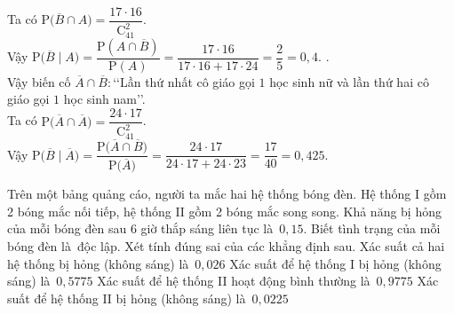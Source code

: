 \begin{ex}
{\begin{itemchoice}
			Ta  có $\mathrm{P}\big(\overline{B}\cap A\big)=\dfrac{17\cdot 16}{\mathrm{C}_{41}^2}$.\\
			Vậy $\mathrm{P}\big(\overline{B}\mid A\big)=\dfrac{\mathrm{P}(A \cap \overline{B})}{\mathrm{P}(A)}=\dfrac{17 \cdot 16}{17 \cdot  16+17 \cdot 24}=\dfrac{2}{5}=0{,}4$.
			.\\ 
			Vậy biến cố $\overline{A}\cap \overline{B}\colon$\lq\lq Lần thứ nhất cô giáo gọi  $1$ học sinh nữ và lần thứ hai cô giáo gọi $1$ học sinh nam\rq\rq.\\
			Ta có $\mathrm{P}\big(\overline{A}\cap \overline{A}\big)=\dfrac{24\cdot 17}{\mathrm{C}_{41}^2}$.\\ 
			 Vậy $\mathrm{P}\big(\overline{B}\mid \overline{A}\big)=\dfrac{\mathrm{P}\big(\overline{A} \cap \overline{B}\big)}{\mathrm{P}\big(\overline{A}\big)}=\dfrac{24 \cdot 17}{24 \cdot 17+24 \cdot 23}=\dfrac{17}{40}=0{,}425$.
		\end{itemchoice}
	} 
\end{ex}

\begin{ex}%
	Trên một bảng quảng cáo, người ta mắc hai hệ thống bóng đèn. Hệ thống I gồm 2 bóng mắc nối tiếp, hệ thống II gồm 2 bóng mắc song song. Khả năng bị hỏng của mỗi bóng đèn sau 6 giờ thắp sáng liên tục là~$0{,}15$. Biết  tình trạng của mỗi bóng đèn là~độc lập. Xét tính đúng sai của các khẳng định sau.
	\choiceTF 
		{Xác  suất cả hai hệ thống bị hỏng (không sáng) là~$0{,}026$}
		{Xác suất  để hệ thống I bị hỏng (không sáng) là~$0{,}5775$}
		{\True Xác suất để  hệ thống II hoạt động bình thường là~$0{,}9775$}
		{\True Xác  suất để hệ thống II bị hỏng (không sáng) là~$0{,}0225$}
\end{ex}

